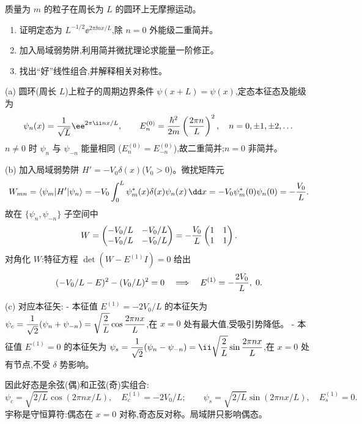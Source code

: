 \begin{question}
质量为 $m$ 的粒子在周长为 $L$ 的圆环上无摩擦运动。
\begin{enumerate}
\item 证明定态为 $L^{-1/2}\ee^{2\pi\ii nx/L}$,除 $n=0$ 外能级二重简并。
\item 加入局域弱势阱,利用简并微扰理论求能量一阶修正。
\item 找出“好”线性组合,并解释相关对称性。
\end{enumerate}
\end{question}
\begin{solution}
(a) 圆环(周长 $L$)上粒子的周期边界条件 $\psi(x+L)=\psi(x)$,定态本征态及能级为
\[
\psi_n(x)={1\over\sqrt L}\ee^{2\pi\ii nx/L},\qquad
E_n^{(0)}={\hbar^2\over2m}\left({2\pi n\over L}\right)^2,\quad n=0,\pm1,\pm2,\dots
\]
$n\ne0$ 时 $\psi_n$ 与 $\psi_{-n}$ 能量相同 ($E_n^{(0)}=E_{-n}^{(0)}$),故二重简并;$n=0$ 非简并。

(b) 加入局域弱势阱 $H'=-V_0\delta(x)$($V_0>0$)。微扰矩阵元
\[
W_{mn}=\langle\psi_m|H'|\psi_n\rangle
=-V_0\int_0^L\psi_m^*(x)\delta(x)\psi_n(x)\,\dd x
=-V_0\psi_m^*(0)\psi_n(0)=-{V_0\over L}.
\]
故在 $\{\psi_n,\psi_{-n}\}$ 子空间中
\[
W=\begin{pmatrix}
-V_0/L & -V_0/L\\
-V_0/L & -V_0/L
\end{pmatrix}
=-{V_0\over L}\begin{pmatrix}1&1\\1&1\end{pmatrix}.
\]
对角化 $W$:特征方程 $\det(W-E^{(1)}I)=0$ 给出
\[
(-V_0/L-E)^2-(V_0/L)^2=0
\quad\Longrightarrow\quad E^{(1)}=-{2V_0\over L},\;0.
\]

(c) 对应本征矢:
- 本征值 $E^{(1)}=-2V_0/L$ 的本征矢为 $\displaystyle\psi_c={1\over\sqrt2}(\psi_n+\psi_{-n})=\sqrt{2\over L}\cos{2\pi nx\over L}$,在 $x=0$ 处有最大值,受吸引势降低。
- 本征值 $E^{(1)}=0$ 的本征矢为 $\displaystyle\psi_s={1\over\sqrt2}(\psi_n-\psi_{-n})=\ii\sqrt{2\over L}\sin{2\pi nx\over L}$,在 $x=0$ 处有节点,不受 $\delta$ 势影响。

因此好态是余弦(偶)和正弦(奇)实组合:
\[
\boxed{\psi_c=\sqrt{2/L}\cos(2\pi nx/L),\quad E_c^{(1)}=-2V_0/L;}\qquad
\boxed{\psi_s=\sqrt{2/L}\sin(2\pi nx/L),\quad E_s^{(1)}=0.}
\]
宇称是守恒算符:偶态在 $x=0$ 对称,奇态反对称。局域阱只影响偶态。
\end{solution}

